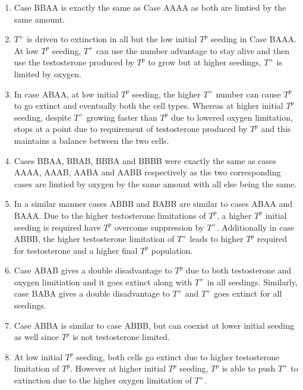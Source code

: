 \begin{enumerate}
  \item Case BBAA is exactly the same as Case AAAA as both are limtied by the same amount.
  \item $T^+$ is driven to extinction in all but the low initial $T^p$ seeding in Case BAAA. At low $T^p$ seeding, $T^+$ can use the number advantage to stay alive and then use the testosterone produced by $T^p$ to grow but at higher seedings, $T^+$ is limited by oxygen.
  \item In case ABAA, at low initial $T^p$ seeding, the higher $T^+$ number can cause $T^p$ to go extinct and eventually both the cell types. Whereas at higher initial $T^p$ seeding, despite $T^+$ growing faster than $T^p$ due to lowered oxygen limitation, stops at a point due to requirement of testosterone produced by $T^p$ and this maintains a balance between the two cells.
  \item Cases BBAA, BBAB, BBBA and BBBB were exactly the same as cases AAAA, AAAB, AABA and AABB respectively as the two corresponding cases are limtied by oxygen by the same amount with all else being the same.
  \item In a similar manner cases ABBB and BABB are similar to cases ABAA and BAAA. Due to the higher testosterone limitations of $T^p$, a higher $T^p$ initial seeding is required have $T^p$ overcome suppression by $T^+$. Additionally in case ABBB, the higher testosterone limitation of $T^+$ leads to higher $T^p$ required for testosterone and a higher final $T^p$ population.
  \item Case ABAB gives a double disadvantage to $T^p$ due to both testosterone and oxygen limitiation and it goes extinct along with $T^+$ in all seedings. Similarly, case BABA gives a double disadvantage to $T^+$ and $T^+$ goes extinct for all seedings.
  \item Case ABBA is similar to case ABBB, but can coexist at lower initial seeding as well since $T^p$ is not testosterone limited.
  \item At low initial $T^p$ seeding, both cells go extinct due to higher testosterone limitation of $T^p$. However at higher initial $T^p$ seeding, $T^p$ is able to push $T^+$ to extinction due to the higher oxygen limitation of $T^+$.
\end{enumerate}


